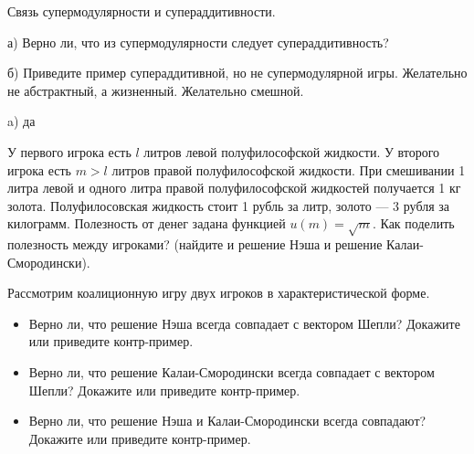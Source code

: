 \begin{problem}
Связь супермодулярности и супераддитивности.

а) Верно ли, что из супермодулярности следует супераддитивность?

б) Приведите пример супераддитивной, но не супермодулярной игры. Желательно не абстрактный, а жизненный. Желательно смешной.



\begin{sol}
a) да
\end{sol}
\end{problem}





\begin{problem}
 У первого игрока есть $l$ литров левой полуфилософской
жидкости. У второго игрока есть $m>l$ литров правой полуфилософской
жидкости. При смешивании 1 литра левой и одного литра правой полуфилософской
жидкостей получается 1 кг золота. Полуфилосовская жидкость стоит 1
рубль за литр, золото — 3 рубля за килограмм. Полезность от денег
задана функцией $u(m)=\sqrt{m}$. Как поделить полезность между игроками?
(найдите и решение Нэша и решение Калаи-Смородински).



\begin{sol}

\end{sol}
\end{problem}



\begin{problem}

 Рассмотрим коалиционную игру двух игроков в характеристической
форме.

\begin{itemize}
\item Верно ли, что решение Нэша всегда совпадает с вектором Шепли? Докажите
или приведите контр-пример.

\item Верно ли, что решение Калаи-Смородински всегда совпадает с вектором
Шепли? Докажите или приведите контр-пример.

\item Верно ли, что решение Нэша и Калаи-Смородински всегда совпадают? Докажите
или приведите контр-пример.
\end{itemize}



\begin{sol}

\end{sol}
\end{problem}



